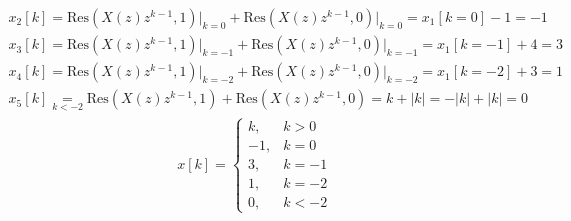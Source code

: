 \documentclass[11pt,a4paper,DIV=12]{scrartcl}
\begin{document}
\begin{align}
	x_2[k]=\mathrm{Res}(X(z)z^{k-1},1)\Bigg |_{k=0}+\mathrm{Res}(X(z)z^{k-1},0)\Bigg |_{k=0}=x_1[k=0]-1=-1
\end{align}
\begin{align}
	x_3[k]=\mathrm{Res}(X(z)z^{k-1},1)\Bigg |_{k=-1}+\mathrm{Res}(X(z)z^{k-1},0)\Bigg |_{k=-1}=x_1[k=-1]+4=3
\end{align}
\begin{align}
	x_4[k]=\mathrm{Res}(X(z)z^{k-1},1)\Bigg |_{k=-2}+\mathrm{Res}(X(z)z^{k-1},0)\Bigg |_{k=-2}=x_1[k=-2]+3=1
\end{align}
\begin{align}
	x_5[k]\underset{k <-2}{=}\mathrm{Res}(X(z)z^{k-1},1)+\mathrm{Res}(X(z)z^{k-1},0)=k+|k|=-|k|+|k|=0
\end{align}
\begin{align}
	x[k]=\begin{cases}
		k, &k>0 \\
		-1, &k=0 \\
		3, &k=-1 \\
		1, &k=-2 \\
		0, &k<-2
	\end{cases}
\end{align}
\end{document}
